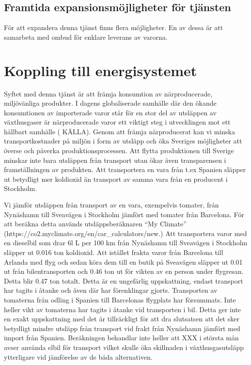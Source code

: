\documentclass[10pt,a4paper,oneside]{article}
\begin{document}
\subsection{Framtida expansionsmöjligheter för tjänsten }
För att expandera denna tjänst finns flera möjligheter. En av dessa är att samarbeta med ombud för enklare leverans av varorna.

\newpage

\section{Koppling till energisystemet}

Syftet med denna tjänst är att främja konsumtion av närproducerade, miljövänliga produkter.  I dagens globaliserade samhälle där den ökande konsumtionen av importerade varor står för en stor del av utsläppen av växthusgaser är närproducerade varor ett viktigt steg i utvecklingen mot ett hållbart samhälle ( KÄLLA). Genom att främja närproducerat kan vi minska transportkostnader på miljön i form av utsläpp och öka Sveriges möjligheter att överse och påverka produktionsprocessen. Att flytta produktionen till Sverige minskar inte bara utsläppen från transport utan ökar även transparensen i framställningen av produkten. Att transportera en vara från t.ex Spanien släpper ut betydligt mer koldioxid än transport av samma vara från en producent i Stockholm.   

Vi jämför utsläppen från transport av en vara, exempelvis tomater, från Nynäshamn till Sveavägen i Stockholm jämfört med tomater från Barcelona. För att beräkna detta används utsläppsberäknaren “My Climate” (https://co2.myclimate.org/en/car_calculators/new.) Att transportera varor med en dieselbil som drar 6l L per 100 km från Nynäshamn till Sveavägen i Stockholm släpper ut 0.016 ton koldioxid. Att istället frakta varor från Barcelona till Arlanda med flyg och sedan köra dem till en butik på Sveavägen släpper ut 0.01 ut från bilentransporten och 0.46 ton ut för vikten av en person under flygresan. Detta blir 0.47 ton totalt. Detta är en ungefärlig uppskattning, endast transport har tagits i åtanke och även där har förenklingar gjorts. Transporten av tomaterna från odling i Spanien till Barcelonas flygplats har försummats. Inte heller vikt av tomaterna har tagits i åtanke vid transporten i bil. Detta ger inte en exakt uppskattning med det är tillräckligt för att dra slutsatsen att det sker betydligt mindre utsläpp från transport vid frakt från Nynäshamn jämfört med import från Spanien. Beräkningen behandlar inte heller att XXX i största mån avser använda elbil för transport vilket skulle öka skillnaden i växthusgasutsläpp ytterligare vid jämförelse av de båda alternativen.
\end{document}
